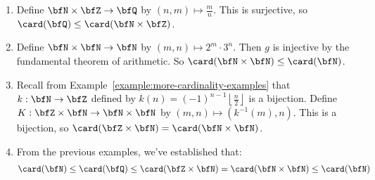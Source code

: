     \begin{example}\label{example:n-z-q}
        \phantom{a}
        \begin{enumerate}[label = (\arabic*)]
            \item Define $\bfN \times \bfZ \rightarrow \bfQ$ by $(n,m) \mapsto \frac{m}{n}$. This is surjective, so $\card(\bfQ) \leq \card(\bfN \times \bfZ)$.
            \item Define $\bfN \times \bfN \rightarrow \bfN$ by $(m,n) \mapsto 2^m \cdot 3^n$. Then $g$ is injective by the fundamental theorem of arithmetic. So $\card(\bfN \times \bfN) \leq \card(\bfN)$.
            \item Recall from Example~\ref{example:more-cardinality-examples} that $k: \bfN \rightarrow \bfZ$ defined by $k(n) = (-1)^{n-1} \left\lfloor \frac{n}{2} \right \rfloor$ is a bijection. Define $K: \bfZ \times \bfN \rightarrow \bfN \times \bfN$ by $(m,n) \mapsto (k^{-1}(m),n)$. This is a bijection, so $\card(\bfZ \times \bfN) = \card(\bfN \times \bfN)$.
            \item From the previous examples, we've established that:
                \begin{equation*}
                \begin{split}
                    \card(\bfN) \leq \card(\bfQ) \leq \card(\bfZ \times \bfN) = \card(\bfN \times \bfN) \leq \card(\bfN)
                \end{split}
                \end{equation*}
        \end{enumerate}
    \end{example}

